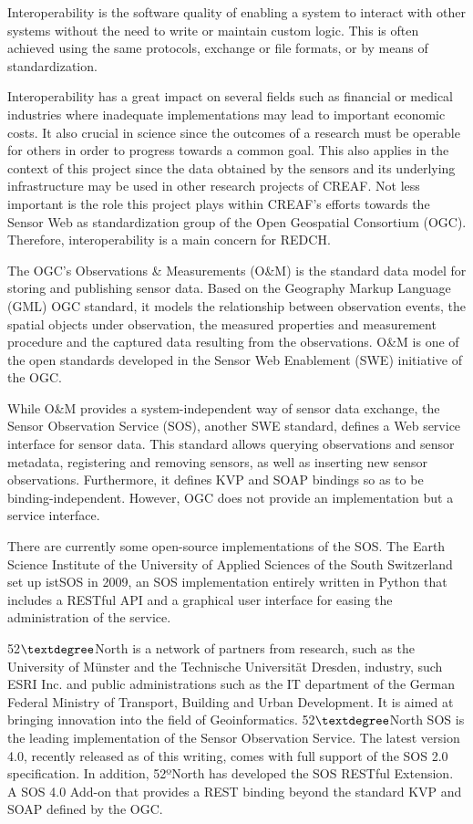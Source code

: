 Interoperability is the software quality of enabling a system to interact with other systems without the need to write or maintain custom logic. This is often achieved using the same protocols, exchange or file formats, or by means of standardization.

Interoperability has a great impact on several fields such as financial or medical industries where inadequate implementations may lead to important economic costs. It also crucial in science since the outcomes of a research must be operable for others in order to progress towards a common goal. This also applies in the context of this project since the data obtained by the sensors and its underlying infrastructure may be used in other research projects of CREAF. Not less important is the role this project plays within CREAF's efforts towards the Sensor Web \cite{SWE} as standardization group of the Open Geospatial Consortium (OGC). Therefore, interoperability is a main concern for REDCH.

The OGC's Observations \& Measurements (O\&M) \cite{OM} is the standard data model for storing and publishing sensor data. Based on the Geography Markup Language (GML) OGC standard, it models the relationship between observation events, the spatial objects under observation, the measured properties and measurement procedure and the captured data resulting from the observations. O\&M is one of the open standards developed in the Sensor Web Enablement (SWE) initiative of the OGC.

While O\&M provides a system-independent way of sensor data exchange, the Sensor Observation Service (SOS), another SWE standard, defines a Web service interface for sensor data. This standard allows querying observations and sensor metadata, registering and removing sensors, as well as inserting new sensor observations. Furthermore, it defines KVP and SOAP bindings so as to be binding-independent. However, OGC does not provide an implementation but a service interface.

There are currently some open-source implementations of the SOS. The Earth Science Institute of the University of Applied Sciences of the South Switzerland set up istSOS \cite{istSOS} in 2009, an SOS implementation entirely written in Python that includes a RESTful API and a graphical user interface for easing the administration of the service.

52$\textdegree$North is a network of partners from research, such as the University of Münster and the Technische Universität Dresden, industry, such ESRI Inc. and public administrations such as the IT department of the German Federal Ministry of Transport, Building and Urban Development. It is aimed at bringing innovation into the field of Geoinformatics. 52$\textdegree$North SOS \cite{52north-SOS} is the leading implementation of the Sensor Observation Service. The latest version 4.0, recently released as of this writing, comes with full support of the SOS 2.0 specification. In addition, 52ºNorth has developed the SOS RESTful Extension. A SOS 4.0 Add-on that provides a REST binding beyond the standard KVP and SOAP defined by the OGC.

